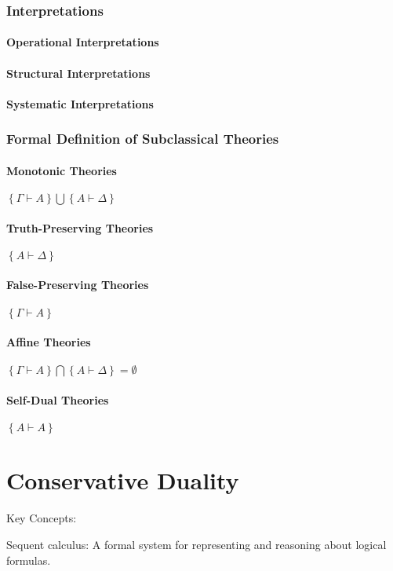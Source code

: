 \documentclass{article}
\begin{document}
\begin{center}
	\section{Interpretations}
		\subsection{Operational Interpretations}
		\subsection{Structural Interpretations}
		\subsection{Systematic Interpretations}
	\section{Formal Definition of Subclassical Theories}
		\subsection{Monotonic Theories}
		$\left\{ Γ ⊢ A \right\} \bigcup \left\{ A ⊢ Δ \right\}$
		\subsection{Truth-Preserving Theories}
		$\left\{ A ⊢ Δ \right\}$
		\subsection{False-Preserving Theories}
		$\left\{ Γ ⊢ A \right\}$
		\subsection{Affine Theories}
		$\left\{ Γ ⊢ A \right\} \bigcap \left\{ A ⊢ Δ \right\}=\emptyset$
		\subsection{Self-Dual Theories}
		$\left\{ A ⊢ A \right\}$
	
\end{center}

\part{Conservative Duality}
Key Concepts:

Sequent calculus: A formal system for representing and reasoning about logical formulas.
\end{document}
